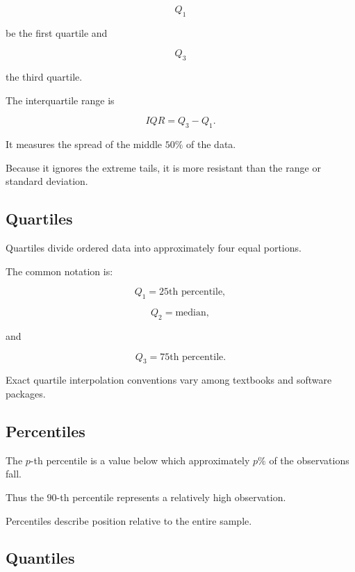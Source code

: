 \[
Q_1
\]

be the first quartile and

\[
Q_3
\]

the third quartile.

The interquartile range is

\[
\boxed{
IQR
=
Q_3-Q_1.
}
\]

It measures the spread of the middle \(50\%\) of the data.

Because it ignores the extreme tails, it is more resistant than the
range or standard deviation.

\subsection{Quartiles}
\label{subsec:quartiles}

Quartiles divide ordered data into approximately four equal portions.

The common notation is:

\[
\boxed{
Q_1
=
25\text{th percentile},
}
\]

\[
\boxed{
Q_2
=
\text{median},
}
\]

and

\[
\boxed{
Q_3
=
75\text{th percentile}.
}
\]

Exact quartile interpolation conventions vary among textbooks and
software packages.

\subsection{Percentiles}
\label{subsec:percentiles}

The \(p\)-th percentile is a value below which approximately \(p\%\) of
the observations fall.

Thus the \(90\)-th percentile represents a relatively high observation.

Percentiles describe position relative to the entire sample.

\subsection{Quantiles}
\label{subsec:sample-quantiles}

